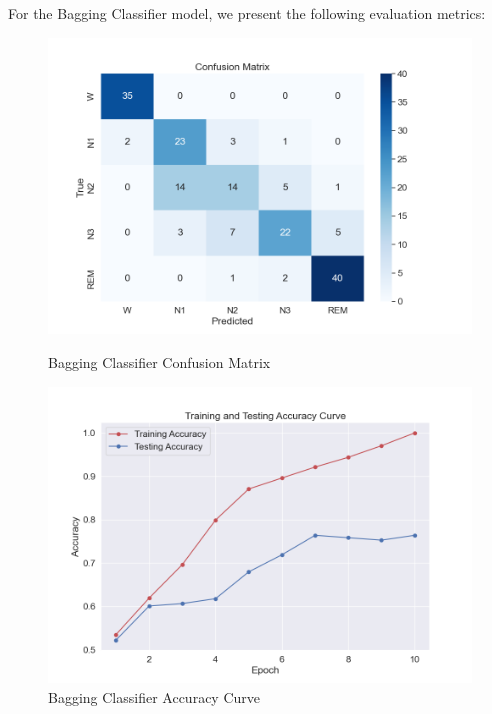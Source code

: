 For the Bagging Classifier model, we present the following evaluation metrics:

\begin{figure}[H]
	\centering
	\begin{minipage}[b]{0.45\textwidth}
		\centering
		\includegraphics[width=\textwidth]{img/paper_1/BG_confusion_matrix.png}
		\caption{Bagging Classifier Confusion Matrix}
	\end{minipage}
	\hfill
	\begin{minipage}[b]{0.45\textwidth}
		\centering
		\includegraphics[width=\textwidth]{img/paper_1/accuracy_curve.png}
		\caption{Bagging Classifier Accuracy Curve}
	\end{minipage}
	
	\vspace{1em}
	

\end{figure}
